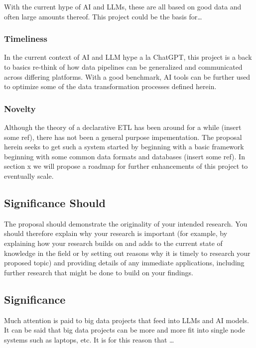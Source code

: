 With the current hype of AI and LLMs, these are all based on good data
and often large amounts thereof. This project could be the basis
for\ldots{}

\subsubsection{Timeliness}\label{timeliness}

In the current context of AI and LLM hype a la ChatGPT, this project is
a back to basics re-think of how data pipelines can be generalized and
communicated across differing platforms. With a good benchmark, AI tools
can be further used to optimize some of the data transformation
processes defined herein.

\subsubsection{Novelty}\label{novelty}

Although the theory of a declarative ETL has been around for a while
(insert some ref), there has not been a general purpose impementation.
The proposal herein seeks to get such a system started by beginning with
a basic framework beginning with some common data formats and databases
(insert some ref). In section x we will propose a roadmap for further
enhancements of this project to eventually scale.

\subsection{Significance Should}\label{significance-should}

The proposal should demonstrate the originality of your intended
research. You should therefore explain why your research is important
(for example, by explaining how your research builds on and adds to the
current state of knowledge in the field or by setting out reasons why it
is timely to research your proposed topic) and providing details of any
immediate applications, including further research that might be done to
build on your findings.

\subsection{Significance}\label{significance}

Much attention is paid to big data projects that feed into LLMs and AI
models. It can be said that big data projects can be more and more fit
into single node systems such as laptops, etc. It is for this reason
that \ldots{}

